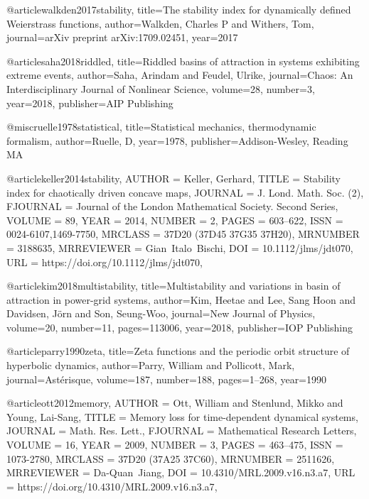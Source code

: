 @article{walkden2017stability,
  title={The stability index for dynamically defined Weierstrass functions},
  author={Walkden, Charles P and Withers, Tom},
  journal={arXiv preprint arXiv:1709.02451},
  year={2017}
}


@article{saha2018riddled,
title={Riddled basins of attraction in systems exhibiting extreme events}, author={Saha, Arindam and Feudel, Ulrike},
journal={Chaos: An Interdisciplinary Journal of Nonlinear Science}, 
volume={28},
number={3}, 
year={2018}, 
publisher={AIP Publishing}
} 


@misc{ruelle1978statistical,
  title={Statistical mechanics, thermodynamic formalism},
  author={Ruelle, D},
  year={1978},
  publisher={Addison-Wesley, Reading MA}
}

@article{keller2014stability,
    AUTHOR = {Keller, Gerhard},
     TITLE = {Stability index for chaotically driven concave maps},
   JOURNAL = {J. Lond. Math. Soc. (2)},
  FJOURNAL = {Journal of the London Mathematical Society. Second Series},
    VOLUME = {89},
      YEAR = {2014},
    NUMBER = {2},
     PAGES = {603--622},
      ISSN = {0024-6107,1469-7750},
   MRCLASS = {37D20 (37D45 37G35 37H20)},
  MRNUMBER = {3188635},
MRREVIEWER = {Gian\ Italo\ Bischi},
       DOI = {10.1112/jlms/jdt070},
       URL = {https://doi.org/10.1112/jlms/jdt070},
}

@article{kim2018multistability,
  title={Multistability and variations in basin of attraction in power-grid systems},
  author={Kim, Heetae and Lee, Sang Hoon and Davidsen, J{\"o}rn and Son, Seung-Woo},
  journal={New Journal of Physics},
  volume={20},
  number={11},
  pages={113006},
  year={2018},
  publisher={IOP Publishing}
}

@article{parry1990zeta,
  title={Zeta functions and the periodic orbit structure of hyperbolic dynamics},
  author={Parry, William and Pollicott, Mark},
  journal={Ast{\'e}risque},
  volume={187},
  number={188},
  pages={1--268},
  year={1990}
}

@article{ott2012memory,
    AUTHOR = {Ott, William and Stenlund, Mikko and Young, Lai-Sang},
     TITLE = {Memory loss for time-dependent dynamical systems},
   JOURNAL = {Math. Res. Lett.},
  FJOURNAL = {Mathematical Research Letters},
    VOLUME = {16},
      YEAR = {2009},
    NUMBER = {3},
     PAGES = {463--475},
      ISSN = {1073-2780},
   MRCLASS = {37D20 (37A25 37C60)},
  MRNUMBER = {2511626},
MRREVIEWER = {Da-Quan\ Jiang},
       DOI = {10.4310/MRL.2009.v16.n3.a7},
       URL = {https://doi.org/10.4310/MRL.2009.v16.n3.a7},
}

